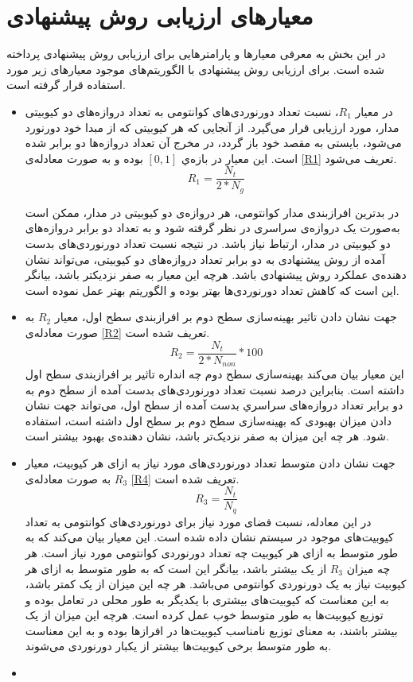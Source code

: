 \section{معیارهای ارزیابی روش پیشنهادی}
در این بخش به معرفی معیارها و پارامترهایی برای ارزیابی روش پیشنهادی پرداخته شده است. برای ارزیابی روش پیشنهادی با الگوریتم‌های موجود معیارهای زیر مورد استفاده قرار گرفته است. 
\begin{itemize}
\item
در معیار $R_1 $، نسبت تعداد دورنوردی‌های کوانتومی به تعداد دروازه‌های دو کیوبیتی مدار، مورد ارزیابی قرار می‌گیرد. از آنجایی که هر کیوبیتی که از مبدا خود دورنورد می‌شود، بایستی به مقصد خود باز گردد، در مخرج آن تعداد دروازه‌ها دو برابر شده است. این معیار در بازه‌ي $[0,1]$ بوده و به صورت معادله‌ی \eqref{R1} تعریف می‌شود.
\begin{equation}
R_1=\frac{N_t}{2*N_g}
\label{R1}
\end{equation}

در بدترین افرازبندی مدار کوانتومی، هر دروازه‌ی دو کیوبیتی در مدار، ممکن است به‌صورت یک دروازه‌ی سراسری در نظر گرفته شود و به تعداد دو برابر دروازه‌های دو کیوبیتی در مدار، ارتباط نیاز باشد. در نتیجه نسبت تعداد دورنوردی‌های بدست آمده از روش پیشنهادی به دو برابر تعداد دروازه‌های دو کیوبیتی، می‌تواند نشان دهنده‌ی عملکرد روش پیشنهادی باشد. هرچه این معیار به صفر نزدیکتر باشد، بیانگر این است که کاهش تعداد دورنوردی‌ها بهتر بوده و الگوریتم بهتر عمل نموده است.
\item
جهت نشان دادن تاثیر بهینه‌سازی سطح دوم بر افرازبندی سطح اول، معیار $R_2 $ به صورت معادله‌ی \eqref{R2} تعریف شده است.
\begin{equation}
R_2=\frac{N_t}{2*N_{non}}*100
\label{R2}
\end{equation}
این معیار بیان می‌کند بهینه‌سازی سطح دوم چه انداره تاثیر بر افرازبندی سطح اول داشته است. بنابراین درصد نسبت تعداد دورنوردی‌های بدست آمده از سطح دوم به دو برابر تعداد دروازه‌های سراسري بدست آمده از سطح اول، می‌تواند جهت نشان دادن میزان بهبودی که بهینه‌سازی سطح دوم بر سطح اول داشته است، استفاده شود. هر چه این میزان به صفر نزدیک‌تر باشد، نشان دهنده‌ی بهبود بیشتر است.

\item
جهت نشان دادن متوسط تعداد دورنوردی‌های مورد نیاز به ازای هر کیوبیت، معیار $R_3 $ به صورت معادله‌ی \ref{R4} تعریف شده است.
\begin{equation}
R_3=\frac{N_t}{N_q}
\label{R4}
\end{equation}
در این معادله، نسبت فضای مورد نیاز برای دورنوردی‌های کوانتومی به تعداد کیوبیت‌های موجود در سیستم نشان داده شده است. این معیار بیان می‌کند که به طور متوسط به ازای هر کیوبیت چه تعداد دورنوردی کوانتومی مورد نیاز است. هر چه میزان $R_3 $ از یک بیشتر باشد، بیانگر این است که به طور متوسط به ازای هر کیوبیت نیاز به یک دورنوردی کوانتومی می‌باشد. هر چه این میزان از یک کمتر باشد، به این معناست که کیوبیت‌های بیشتری با یکدیگر به طور محلی در تعامل بوده و توزیع کیوبیت‌ها به طور متوسط خوب عمل کرده است. هرچه این میزان از یک بیشتر باشند، به معنای توزیع نامناسب کیوبیت‌ها در افرازها بوده و به این معناست به طور متوسط برخی کیوبیت‌ها بیشتر از یکبار دورنوردی می‌شوند.
\item


\end{itemize}
